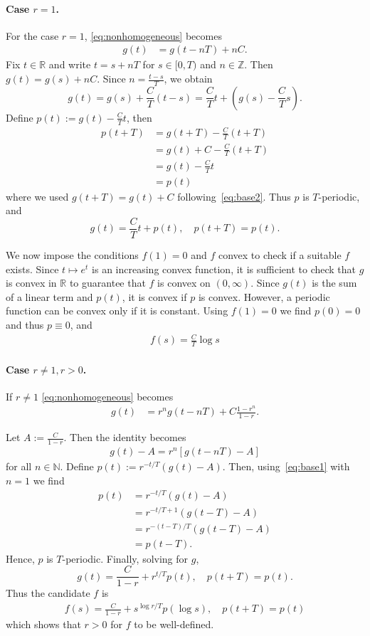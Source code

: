 \documentclass{article}
\newcommand{\R}{\mathbb R}
\begin{document}
\paragraph*{Case $r=1$.}
For the case $r=1$, \eqref{eq:nonhomogeneous} becomes
\begin{align}
\label{eq:base2}
  g(t)&=g(t-nT)+nC.
\end{align}
Fix $t\in\R$ and write 
$t=s+nT$ for $s\in[0,T)$ and $n\in\mathbb{Z}$. 
Then $g(t)=g(s)+nC$.
Since \(n=\frac{t-s}{T}\), we obtain
\[
g(t)=g(s)+\frac{C}{T}(t-s)
=\frac{C}{T}t+\left(g(s)-\frac{C}{T}s\right).
\]
Define $p(t):=g(t)-\frac{C}{T}t$, then
\begin{align*}
   p(t+T)&=g(t+T)-\frac{C}{T}(t+T)\\
   &=g(t)+C-\frac{C}{T}(t+T)\\
   &=g(t)-\frac{C}{T}t\\
&= p(t)
\end{align*}
where we used $g(t+T)=g(t)+C$ following~\eqref{eq:base2}. Thus \(p\) is \(T\)-periodic, and
\[
g(t)=\frac{C}{T}t+p(t),
\quad p(t+T)=p(t).
\]

We now impose the conditions $f(1)=0$ and $f$ convex to check if a suitable $f$ exists.
Since \(t \mapsto e^t\) is an increasing convex function, it is sufficient to check that $g$ is convex in $\R$ to guarantee that $f$ is convex on $(0,\infty)$.
Since $g(t)$ is the sum of a linear term and $p(t)$, it is convex if $p$ is convex.
However, a periodic function can be convex only if it is constant.
Using \(f(1)=0\) we find $p(0)=0$ and thus  \(p\equiv 0\), and
\begin{align*}
    f(s)=\frac{C}{ T}\log s
\end{align*}

\paragraph*{Case $r\neq 1, r>0$.}
If $r\neq 1$ \eqref{eq:nonhomogeneous} becomes
\begin{align*}
g(t)&=r^n g(t-nT)+C\frac{1-r^n}{1-r}.
\end{align*}


Let $A:=\frac{C}{1-r}$. Then the identity becomes
\begin{align}
\label{eq:base1}
g(t)-A=r^n [g(t-nT)-A]
\end{align}
for all $n\in\mathbb{N}$.
Define $p(t):= r^{-t/T}(g(t)-A)$.
Then, using~\eqref{eq:base1} with $n=1$ we find
\begin{align*}
    p(t) &= r^{-t/T}(g(t)-A)\\
&= r^{-t/T+1} (g(t-T)-A)\\
&= r^{-(t-T)/T}(g(t-T)-A)\\
&= p(t-T).
\end{align*}
Hence,  \(p\) is \(T\)-periodic.
Finally, solving for \(g\),
\[
g(t)= \frac{C}{1-r} + r^{t/T} p(t),
\quad p(t+T)=p(t).
\]
Thus the candidate $f$ is
\begin{align*}
    f(s)= \frac{C}{1-r} + s^{\log r/T} p(\log s),
\quad p(t+T)=p(t)
\end{align*}
which shows that $r>0$ for $f$ to be well-defined.
\end{document}
